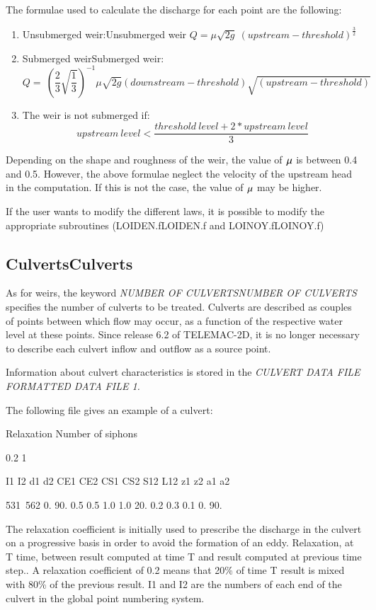 \documentclass{article} %
\begin{document}
 The formulae used to calculate the discharge for each point are the following:

\begin{enumerate}
\item  Unsubmerged weir:Unsubmerged weir   $Q=\mu \sqrt{2g}\ {\left(upstream-threshold\right)}^{\frac{3}{2}}$

\item  Submerged weirSubmerged weir:
\[Q=\ {\left(\frac{2}{3}\sqrt{\frac{1}{3}}\right)}^{-1}\mu \sqrt{2g}\left(downstream-threshold\right)\sqrt{\left(upstream-threshold\right)}\]

\item  The weir is not submerged if:
\[upstream\ level<\frac{threshold\ level+2*upstream\ level}{3}\]
\end{enumerate}
Depending on the shape and roughness of the weir, the value of ${\kern 1pt} \mu $ is between 0.4 and 0.5. However, the above formulae neglect the velocity of the upstream head in the computation. If this is not the case, the value of ${\kern 1pt} \mu $ may be higher.

 If the user wants to modify the different laws, it is possible to modify the appropriate subroutines (LOIDEN.fLOIDEN.f and LOINOY.fLOINOY.f)


\subsection{ CulvertsCulverts}

 As for weirs, the keyword \textit{NUMBER OF CULVERTSNUMBER OF CULVERTS} specifies the number of culverts to be treated. Culverts are described as couples of points between which flow may occur, as a function of the respective water level at these points. Since release 6.2 of TELEMAC-2D, it is no longer necessary to describe each culvert inflow and outflow as a source point.

 Information about culvert characteristics is stored in the \textit{CULVERT DATA FILE FORMATTED DATA FILE 1.}

 The following file gives an example of a culvert:

 Relaxation   Number of siphons

   0.2              1

 I1   I2  d1  d2   CE1  CE2  CS1   CS2   S12  L12  z1   z2  a1   a2

 531~562  0.  90.  0.5  0.5  1.0   1.0   20.  0.2  0.3  0.1  0.  90.

 The relaxation coefficient is initially used to prescribe the discharge in the culvert on a progressive basis in order to avoid the formation of an eddy. Relaxation, at T time, between result computed at time T and result computed at previous time step.. A relaxation coefficient of 0.2 means that 20\% of time T result is mixed with 80\% of the previous result. I1 and I2 are the numbers of each end of the culvert in the global point numbering system.
\end{document}
